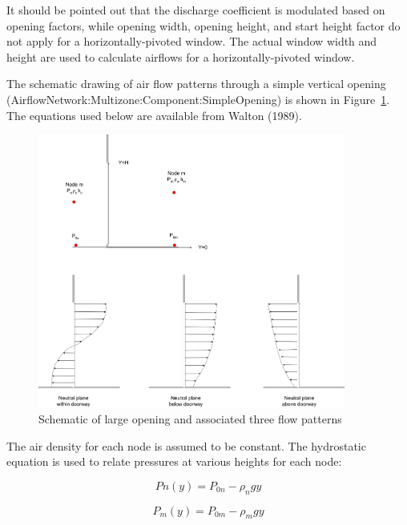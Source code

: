 It should be pointed out that the discharge coefficient is modulated based on opening factors, while opening width, opening height, and start height factor do not apply for a horizontally-pivoted window. The actual window width and height are used to calculate airflows for a horizontally-pivoted window.

The schematic drawing of air flow patterns through a simple vertical opening (AirflowNetwork:Multizone:Component:SimpleOpening) is shown in Figure~\ref{fig:schematic-of-large-opening-and-associated}. The equations used below are available from Walton (1989).

\begin{figure}[hbtp] %
\centering
\includegraphics[width=0.9\textwidth, height=0.9\textheight, keepaspectratio=true]{media/image2708.svg.png}
\caption{Schematic of large opening and associated three flow patterns \protect \label{fig:schematic-of-large-opening-and-associated}}
\end{figure}

The air density for each node is assumed to be constant. The hydrostatic equation is used to relate pressures at various heights for each node:

\begin{equation}
Pn\left( y \right) = {P_{0n}} - {\rho_n}gy
\end{equation}

\begin{equation}
{P_m}(y) = {P_{0m}} - {\rho_m}gy
\end{equation}

